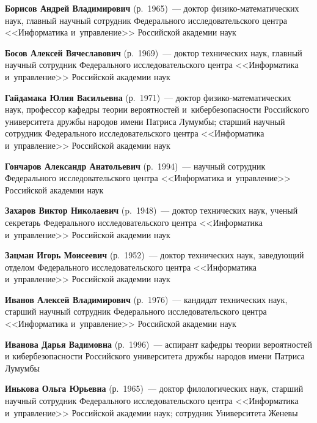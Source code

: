 \begin{multicols}{2}





\noindent
\textbf{Борисов Андрей Владимирович} (р.\ 1965)~--- доктор фи\-зи\-ко-ма\-те\-ма\-ти\-че\-ских наук, 
главный научный сотрудник Федерального исследовательского цент\-ра <<Информатика и~управ\-ле\-ние>> Российской академии наук

\noindent
\textbf{Босов Алексей Вячеславович} (р.\ 1969)~--- 
доктор технических наук, главный научный сотрудник Федерального исследовательского цент\-ра <<Информатика и~управ\-ле\-ние>>
 Российской академии наук
 
 \noindent
\textbf{Гайдамака Юлия Васильевна} (р.\ 1971)~--- доктор фи\-зи\-ко-ма\-те\-ма\-ти\-че\-ских наук, 
профессор ка\-фед\-ры тео\-рии вероятностей и~ки\-бер\-безопас\-ности Российского университета друж\-бы народов имени \mbox{Патриса} Лумумбы; 
старший научный сотрудник Федерального исследовательского цент\-ра  <<Информатика и~управ\-ле\-ние>> Российской академии наук  


\noindent
\textbf{Гончаров Александр Анатольевич} (р.\ 1994)~--- 
научный сотрудник Федерального исследовательского цент\-ра <<Информатика и~управ\-ле\-ние>> Российской академии наук

\noindent
\textbf{Захаров Виктор Николаевич} (p.\ 1948)~--- 
доктор технических наук, ученый секретарь Федерального исследовательского цент\-ра <<Информатика и~управ\-ле\-ние>> Российской академии наук



\noindent
\textbf{Зацман Игорь Моисеевич} (р.\ 1952)~--- 
доктор тех\-нических наук, за\-ве\-ду\-ющий отделом Федерального исследовательского цент\-ра 
<<Информатика и~управ\-ле\-ние>> Российской академии наук


 \noindent
\textbf{Иванов Алексей Владимирович} (р.\ 1976)~--- 
кандидат технических наук, старший научный сотрудник Федерального исследовательского цент\-ра <<Информатика и~управ\-ле\-ние>> Российской академии наук

\noindent
\textbf{Иванова Дарья Вадимовна} (р.\ 1996)~--- 
аспирант кафедры теории вероятностей и кибербезопасности Российского университета друж\-бы народов имени Патриса Лумумбы

\noindent
\textbf{Инькова Ольга Юрьевна} (р.\ 1965)~--- 
доктор филологических наук, старший научный сотрудник Федерального исследовательского цент\-ра <<Информатика и~управ\-ле\-ние>>
 Российской академии наук; сотрудник Университета Женевы
 

\end{multicols}
